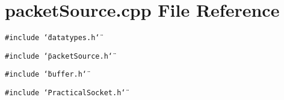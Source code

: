 \section{packet\-Source.cpp File Reference}
\label{packetSource_8cpp}
{\tt \#include \char`\"{}datatypes.h\char`\"{}}\par
{\tt \#include \char`\"{}packet\-Source.h\char`\"{}}\par
{\tt \#include \char`\"{}buffer.h\char`\"{}}\par
{\tt \#include \char`\"{}Practical\-Socket.h\char`\"{}}\par
